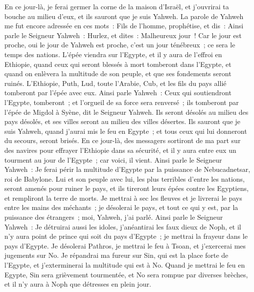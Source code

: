 \begin{multicols}{2}
En ce jour-là, je ferai germer la corne de la maison d'Israël, et j'ouvrirai ta bouche au milieu d'eux, et ils sauront que je suis Yahweh.
\VerseOne{}La parole de Yahweh me fut encore adressée en ces mots~:
Fils de l'homme, prophétise, et dis~: Ainsi parle le Seigneur Yahweh~: Hurlez, et dites~: Malheureux jour~!
Car le jour est proche, oui le jour de Yahweh est proche, c'est un jour ténébreux~; ce sera le temps des nations.
L'épée viendra sur l'Egypte, et il y aura de l'effroi en Ethiopie, quand ceux qui seront blessés à mort tomberont dans l'Egypte, et quand on enlèvera la multitude de son peuple, et que ses fondements seront ruinés.
L'Ethiopie, Puth, Lud, toute l'Arabie, Cub, et les fils du pays allié tomberont par l'épée avec eux.
Ainsi parle Yahweh~: Ceux qui soutiendront l'Egypte, tomberont~; et l'orgueil de sa force sera renversé~; ils tomberont par l'épée de Migdol à Syène, dit le Seigneur Yahweh.
Ils seront désolés au milieu des pays désolés, et ses villes seront au milieu des villes désertes.
Ils sauront que je suis Yahweh, quand j'aurai mis le feu en Egypte~; et tous ceux qui lui donneront du secours, seront brisés.
En ce jour-là, des messagers sortiront de ma part sur des navires pour effrayer l'Ethiopie dans sa sécurité, et il y aura entre eux un tourment au jour de l'Egypte~; car voici, il vient.
Ainsi parle le Seigneur Yahweh~: Je ferai périr la multitude d'Egypte par la puissance de Nebucadnetsar, roi de Babylone.
Lui et son peuple avec lui, les plus terribles d'entre les nations, seront amenés pour ruiner le pays, et ils tireront leurs épées contre les Egyptiens, et rempliront la terre de morts.
Je mettrai à sec les fleuves et je livrerai le pays entre les mains des méchants~; je désolerai le pays, et tout ce qui y est, par la puissance des étrangers~; moi, Yahweh, j'ai parlé.
Ainsi parle le Seigneur Yahweh~: Je détruirai aussi les idoles, j'anéantirai les faux dieux de Noph, et il n'y aura point de prince qui soit du pays d'Egypte~; je mettrai la frayeur dans le pays d'Egypte.
Je désolerai Pathros, je mettrai le feu à Tsoan, et j'exercerai mes jugements sur No.
Je répandrai ma fureur sur Sin, qui est la place forte de l'Egypte, et j'exterminerai la multitude qui est à No.
Quand je mettrai le feu en Egypte, Sin sera grièvement tourmentée, et No sera rompue par diverses brèches, et il n'y aura à Noph que détresses en plein jour.

\end{multicols}
